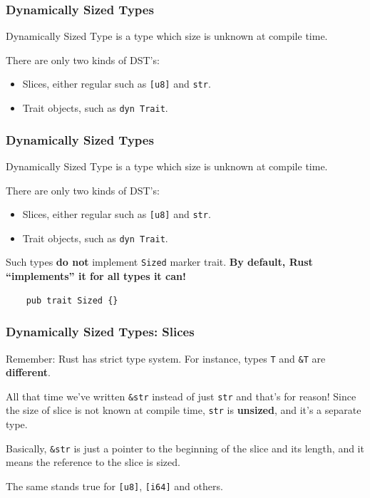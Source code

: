 \documentclass[aspectratio=1610,t]{beamer}
\begin{document}

\begin{frame}[fragile]
\frametitle{Dynamically Sized Types}
Dynamically Sized Type is a type which size is unknown at compile time.

There are only two kinds of DST's:

\begin{itemize}
    \item Slices, either regular such as \texttt{[u8]} and \texttt{str}.
    \item Trait objects, such as \texttt{dyn Trait}.
\end{itemize}
\end{frame}


\begin{frame}[fragile]
\frametitle{Dynamically Sized Types}
Dynamically Sized Type is a type which size is unknown at compile time.

There are only two kinds of DST's:

\begin{itemize}
    \item Slices, either regular such as \texttt{[u8]} and \texttt{str}.
    \item Trait objects, such as \texttt{dyn Trait}.
\end{itemize}

Such types \textbf{do not} implement \texttt{Sized} marker trait. \textbf{By default, Rust ``implements'' it for all types it can!}

\begin{verbatim}
    pub trait Sized {}
\end{verbatim}
\end{frame}


\begin{frame}[fragile]
\frametitle{Dynamically Sized Types: Slices}
Remember: Rust has strict type system. For instance, types \texttt{T} and \texttt{\&T} are \textbf{different}.

All that time we've written \texttt{\&str} instead of just \texttt{str} and that's for reason! Since the size of slice is not known at compile time, \texttt{str} is \textbf{unsized}, and it's a separate type.

Basically, \texttt{\&str} is just a pointer to the beginning of the slice and its length, and it means the reference to the slice is sized.

The same stands true for \texttt{[u8]}, \texttt{[i64]} and others.
\end{frame}
\end{document}
